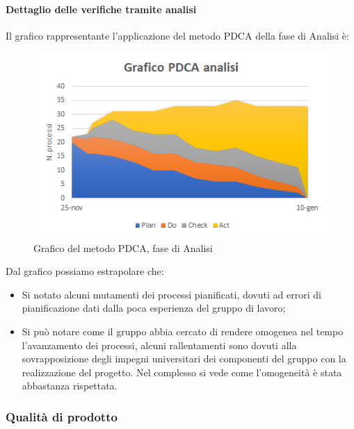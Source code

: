 \renewcommand{\arraystretch}{1}
\paragraph{Dettaglio delle verifiche tramite analisi} \Spazio
Il grafico rappresentante l'applicazione del metodo PDCA della fase di Analisi è:
\begin{figure} [H]
	\centering
	\includegraphics[scale=1]{Img/Grafico_PDCA}
	\caption{Grafico del metodo PDCA, fase di Analisi}\label{}
\end{figure}
Dal grafico possiamo estrapolare che:
\begin{itemize}
	\item Si notato alcuni mutamenti dei processi pianificati, dovuti ad errori di pianificazione dati dalla poca esperienza del gruppo di lavoro;
	\item Si può notare come il gruppo abbia cercato di rendere omogenea nel tempo l'avanzamento dei processi, alcuni rallentamenti sono dovuti alla sovrapposizione degli impegni
	universitari dei componenti del gruppo con la realizzazione del progetto. Nel complesso si vede come l'omogeneità è stata abbastanza rispettata.
\end{itemize}
\subsubsection{Qualità di prodotto}
